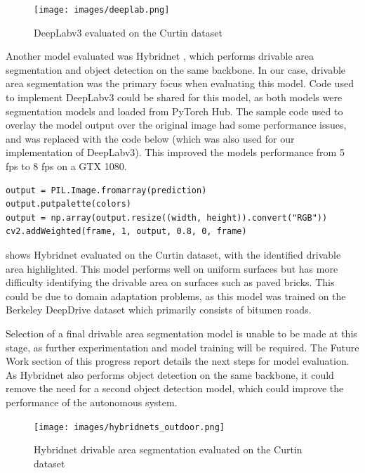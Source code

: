 \documentclass[12pt]{article}
\begin{document}
\begin{figure}[H]
    \centering
    \texttt{[image: images/deeplab.png]}
    \caption{DeepLabv3 evaluated on the Curtin dataset}
    \label{fig:deeplab}
\end{figure}

Another model evaluated was Hybridnet \cite{vuHybridNetsEndtoEndPerception2022}, which performs drivable area segmentation
and object detection on the same backbone. In our case, drivable area segmentation was the primary focus when evaluating this model.
Code used to implement DeepLabv3 could be shared for this model, as both models were segmentation models
and loaded from PyTorch Hub. The sample code used to overlay the model output over the original image had some
performance issues, and was replaced with the code below (which was also used for our implementation of DeepLabv3).
This improved the models performance from 5 fps to 8 fps on a GTX 1080.
\begin{verbatim}
output = PIL.Image.fromarray(prediction)
output.putpalette(colors)
output = np.array(output.resize((width, height)).convert("RGB"))
cv2.addWeighted(frame, 1, output, 0.8, 0, frame)
\end{verbatim}

 shows Hybridnet evaluated on the Curtin dataset, with the identified drivable area highlighted.
This model performs well on uniform surfaces but has more difficulty identifying the drivable area on surfaces such as paved bricks.
This could be due to domain adaptation problems, as this model was trained on the Berkeley DeepDrive dataset \cite{yuBDD100KDiverseDriving2018}
which primarily consists of bitumen roads.

Selection of a final drivable area segmentation model is unable to be made at this stage, as further experimentation and model training
will be required. The Future Work section of this progress report details the next steps for model evaluation.
As Hybridnet also performs object detection on the same backbone, it could remove the need for a second object detection model,
which could improve the performance of the autonomous system.

\begin{figure}[H]
    \centering
    \texttt{[image: images/hybridnets\_outdoor.png]}
    \caption{Hybridnet drivable area segmentation evaluated on the Curtin dataset}
    \label{fig:hybridnets_outdoor}
\end{figure}
\end{document}
